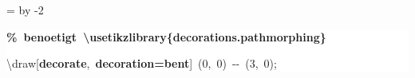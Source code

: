 \begingroup
\ttfamily
{}
=\textwidth
\advance{} by -2\fboxsep
\noindent
\colorbox{background}
{%
\parbox{\dimen255}
{%
\rule[-0.5ex]{0pt}{2.5ex}\hspace*{0.0em}\textcolor{G}{\textbf{\%~benoetigt~\textbackslash{}usetikzlibrary\{decorations.pathmorphing\}}}\\
\rule[-0.5ex]{0pt}{2.5ex}\hspace*{0.0em}\textbackslash{}draw[\textcolor{R}{\textbf{decorate}},~\textcolor{R}{\textbf{decoration=bent}}]~(0,~0)~{-}{-}~(3,~0);}%
}%
\endgroup
